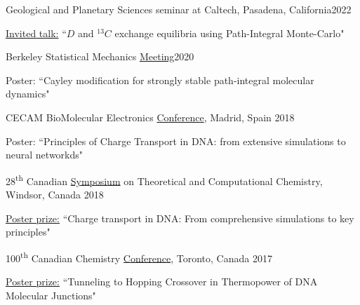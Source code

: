\documentclass[margin,line]{res}
\newenvironment{list1}{
  \begin{list}{\ding{113}}{%
      \setlength{\itemsep}{0in}
      \setlength{\parsep}{0in} \setlength{\parskip}{0in}
      \setlength{\topsep}{0in} \setlength{\partopsep}{0in} 
      \setlength{\leftmargin}{0.17in}}}{\end{list}}
\begin{document}
\begin{resume}
Geological and Planetary Sciences seminar at Caltech, Pasadena, California\hfill{2022}

\begin{list1}
\item[]\underline{Invited talk:} ``$D$ and $^{13}C$ exchange equilibria using Path-Integral Monte-Carlo"
\end{list1}

\vspace*{-2mm}

Berkeley Statistical Mechanics  \href{http://berkeleystatmech.org/}{Meeting}\hfill{2020}

\begin{list1}
\item[]Poster: ``Cayley modification for strongly stable path-integral molecular dynamics"
\end{list1}

\vspace*{-2mm}

CECAM BioMolecular Electronics \href{https://www.cecam.org/workshop-details/cecampsi-k-research-conference-biomolecular-electronics-biomolectro-246}{Conference}, Madrid, Spain \hfill {2018}

\begin{list1}
\item[]Poster: ``Principles of Charge Transport in DNA: from extensive simulations to neural networkds"
\end{list1}

\vspace*{-2mm}

28\textsuperscript{th} Canadian \href{http://catc.ca/cstcc2018}{Symposium} on Theoretical and Computational Chemistry, Windsor, Canada \hfill {2018}

\begin{list1}
\item[]\underline{Poster prize:} ``Charge transport in DNA: From comprehensive simulations to key principles"
\end{list1}

\vspace*{-2mm}

100\textsuperscript{th} Canadian Chemistry \href{https://www.cheminst.ca/magazine/article/csc-celebrates-100-years-of-chemistry-in-toronto/}{Conference}, Toronto, Canada \hfill {2017}

\begin{list1}
\item[]\underline{Poster prize:} ``Tunneling to Hopping Crossover in Thermopower of DNA Molecular Junctions" 
\end{list1}


\end{resume}
\end{document}
